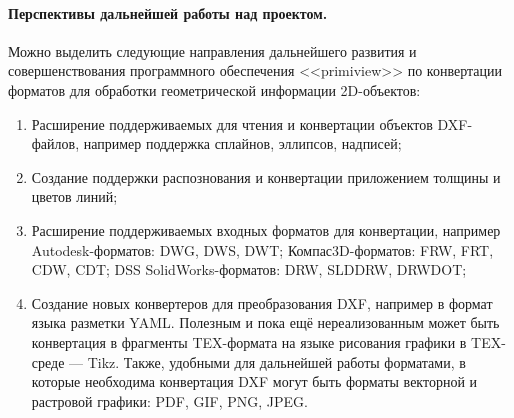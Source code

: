 \paragraph{Перспективы дальнейшей работы над проектом.} Можно выделить следующие направления дальнейшего развития и совершенствования программного обеспечения <<primiview>> по конвертации форматов для обработки геометрической информации 2D-объектов:

\begin{enumerate}[1)]
	\item Расширение поддерживаемых для чтения и конвертации объектов DXF-файлов, например поддержка сплайнов, эллипсов, надписей;
	\item Создание поддержки распознования и конвертации приложением толщины и цветов линий;
	\item Расширение поддерживаемых входных форматов для конвертации, например Autodesk-форматов: DWG, DWS, DWT; Компас3D-форматов: FRW, FRT, CDW, CDT; DSS SolidWorks-форматов: DRW, SLDDRW, DRWDOT;
	\item Создание новых конвертеров для преобразования DXF, например в формат языка разметки YAML. Полезным и пока ещё нереализованным может быть конвертация в фрагменты TEX-формата на языке рисования графики в TEX-среде --- Tikz. Также, удобными для дальнейшей работы форматами, в которые необходима конвертация DXF могут быть форматы векторной и растровой графики: PDF, GIF, PNG, JPEG.
\end{enumerate}


